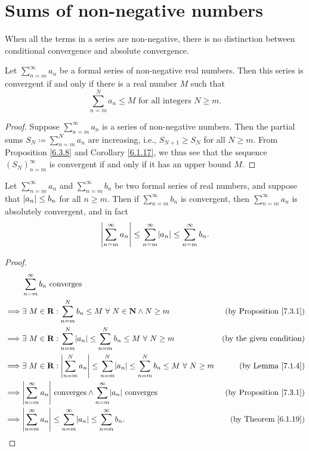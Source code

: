 \section{Sums of non-negative numbers}\label{sec 7.3}

\begin{note}
When all the terms in a series are non-negative, there is no distinction between conditional convergence and absolute convergence.
\end{note}

\begin{proposition}\label{7.3.1}
Let \(\sum_{n = m}^\infty a_n\) be a formal series of non-negative real numbers.
Then this series is convergent if and only if there is a real number \(M\) such that
\[
    \sum_{n = m}^N a_n \leq M \text{ for all integers } N \geq m.
\]
\end{proposition}

\begin{proof}
Suppose \(\sum_{n = m}^\infty a_n\) is a series of non-negative numbers.
Then the partial sums \(S_N \coloneqq \sum_{n = m}^N a_n\) are increasing, i.e., \(S_{N + 1} \geq S_N\) for all \(N \geq m\).
From Proposition \ref{6.3.8} and Corollary \ref{6.1.17}, we thus see that the sequence \((S_N)_{n = m}^\infty\) is convergent if and only if it has an upper bound \(M\).
\end{proof}

\begin{corollary}\label{7.3.2}
Let \(\sum_{n = m}^\infty a_n\) and \(\sum_{n = m}^\infty b_n\) be two formal series of real numbers, and suppose that \(\abs*{a_n} \leq b_n\) for all \(n \geq m\).
Then if \(\sum_{n = m}^\infty b_n\) is convergent, then \(\sum_{n = m}^\infty a_n\) is absolutely convergent, and in fact
\[
    \abs*{\sum_{n = m}^\infty a_n} \leq \sum_{n = m}^\infty \abs*{a_n} \leq \sum_{n = m}^\infty b_n.
\]
\end{corollary}

\begin{proof}
\begin{align*}
& \sum_{n = m}^\infty b_n \text{ converges} \\
\implies & \exists\ M \in \mathbf{R} : \sum_{n = m}^N b_n \leq M \ \forall\ N \in \mathbf{N} \land N \geq m & \text{(by Proposition \ref{7.3.1})} \\
\implies & \exists\ M \in \mathbf{R} : \sum_{n = m}^N \abs*{a_n} \leq \sum_{n = m}^N b_n \leq M \ \forall\ N \geq m & \text{(by the given condition)} \\
\implies & \exists\ M \in \mathbf{R} : \abs*{\sum_{n = m}^N a_n} \leq \sum_{n = m}^N \abs*{a_n} \leq \sum_{n = m}^N b_n \leq M \ \forall\ N \geq m & \text{(by Lemma \ref{7.1.4})} \\
\implies & \abs*{\sum_{n = m}^\infty a_n} \text{ converges} \land \sum_{n = m}^\infty \abs*{a_n} \text{ converges} & \text{(by Proposition \ref{7.3.1})} \\
\implies & \abs*{\sum_{n = m}^\infty a_n} \leq \sum_{n = m}^\infty \abs*{a_n} \leq \sum_{n = m}^\infty b_n. & \text{(by Theorem \ref{6.1.19})}
\end{align*}
\end{proof}

